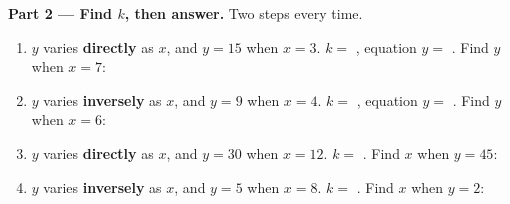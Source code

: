 \documentclass[10pt]{article}
\begin{document}
\begin{tcolorbox}[colback=white, colframe=black!40, title=\textbf{Tier R --- Remediate},
    fonttitle=\bfseries, arc=1.5mm, left=3mm, right=3mm, top=2mm, bottom=2mm, breakable]
\vspace{5pt}
\textbf{Part 2 --- Find $k$, then answer.} Two steps every time.
\begin{enumerate}[label=(\alph*), leftmargin=2.1em, itemsep=5pt]
  \item $y$ varies \textbf{directly} as $x$, and $y=15$ when $x=3$. \; $k=$ ,
        equation $y=$ . \; Find $y$ when $x=7$: 
  \item $y$ varies \textbf{inversely} as $x$, and $y=9$ when $x=4$. \; $k=$ ,
        equation $y=$ . \; Find $y$ when $x=6$: 
  \item $y$ varies \textbf{directly} as $x$, and $y=30$ when $x=12$. \; $k=$ . \;
        Find $x$ when $y=45$: 
  \item $y$ varies \textbf{inversely} as $x$, and $y=5$ when $x=8$. \; $k=$ . \;
        Find $x$ when $y=2$: 
\end{enumerate}


\end{tcolorbox}
\end{document}
